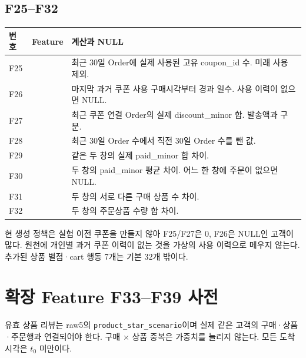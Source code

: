 \documentclass[11pt,a4paper]{article}
\newcommand{\code}[1]{{\ttfamily\footnotesize\nolinkurl{#1}}}
\newcommand{\page}{\clearpage}
\newcommand{\thead}{\rowcolor{pale}}
\begin{document}
\subsection*{F25--F32}
\begin{tabularx}{\linewidth}{@{}P{.065\linewidth}P{.36\linewidth}Y@{}}\thead 번호 & Feature & 계산과 NULL\\\midrule
F25 & {\ttfamily\scriptsize{}} & 최근 30일 Order에 실제 사용된 고유 coupon\_id 수. 미래 사용 제외. \\[5pt]
F26 & {\ttfamily\scriptsize{}} & 마지막 과거 쿠폰 사용 구매시각부터 경과 일수. 사용 이력이 없으면 NULL. \\[5pt]
F27 & {\ttfamily\scriptsize{}} & 최근 쿠폰 연결 Order의 실제 discount\_minor 합. 발송액과 구분. \\[5pt]
F28 & {\ttfamily\scriptsize{}} & 최근 30일 Order 수에서 직전 30일 Order 수를 뺀 값. \\[5pt]
F29 & {\ttfamily\scriptsize{}} & 같은 두 창의 실제 paid\_minor 합 차이. \\[5pt]
F30 & {\ttfamily\scriptsize{}} & 두 창의 paid\_minor 평균 차이. 어느 한 창에 주문이 없으면 NULL. \\[5pt]
F31 & {\ttfamily\scriptsize{}} & 두 창의 서로 다른 구매 상품 수 차이. \\[5pt]
F32 & {\ttfamily\scriptsize{}} & 두 창의 주문상품 수량 합 차이. \\[5pt]
\bottomrule\end{tabularx}
현 생성 정책은 실험 이전 쿠폰을 만들지 않아 F25/F27은 0, F26은 NULL인 고객이 많다. 원천에 개인별 과거 쿠폰 이력이 없는 것을 가상의 사용 이력으로 메우지 않는다. 추가된 상품 별점·cart 행동 7개는 기본 32개 밖이다.
\page
\section{확장 Feature F33--F39 사전}
유효 상품 리뷰는 raw5의 \code{product_star_scenario}이며 실제 같은 고객의 구매·상품·주문행과 연결되어야 한다. 구매 $\times$ 상품 중복은 가중치를 늘리지 않는다. 모든 도착시각은 $t_0$ 미만이다.
\end{document}
